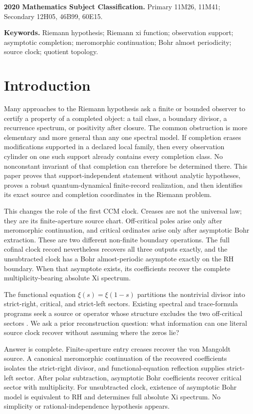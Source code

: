 \documentclass[11pt]{article}
\theoremstyle{definition}
\theoremstyle{remark}
\begin{document}
\medskip
\noindent\textbf{2020 Mathematics Subject Classification.}
Primary 11M26, 11M41; Secondary 12H05, 46B99, 60E15.

\noindent\textbf{Keywords.}
Riemann hypothesis; Riemann xi function; observation support; asymptotic completion;
meromorphic continuation; Bohr almost periodicity; source clock; quotient topology.

\section{Introduction}\label{sec:intro}

Many approaches to the Riemann hypothesis ask a finite or bounded observer to certify a property
of a completed object: a tail class, a boundary divisor, a recurrence spectrum, or positivity
after closure.  The common obstruction is more elementary and more general than any one spectral
model.  If completion erases modifications supported in a declared local family, then every
observation cylinder on one such support already contains every completion class.  No
nonconstant invariant of that completion can therefore be determined there.  This paper proves
that support-independent statement without analytic hypotheses, proves a robust
quantum-dynamical finite-record realization, and then identifies its exact source and completion
coordinates in the Riemann problem.

This changes the role of the first CCM clock.  Creases are not the universal law; they are its
finite-aperture source chart.  Off-critical poles arise
only after meromorphic continuation, and critical ordinates arise only after asymptotic Bohr
extraction.  These are two different non-finite boundary operations.  The full cofinal clock
record nevertheless recovers all three outputs exactly, and the unsubtracted clock has a Bohr
almost-periodic asymptote exactly on the RH boundary.  When that asymptote exists, its coefficients
recover the complete multiplicity-bearing absolute Xi spectrum.


The functional equation $\xi(s)=\xi(1-s)$ partitions the nontrivial divisor into strict-right,
critical, and strict-left sectors.  Existing spectral and trace-formula programs seek a source or
operator whose structure excludes the two off-critical sectors
\cite{Connes1999,Meyer2005,Hedenmalm2026,ConnesConsaniMoscovici2025}.  We ask a prior
reconstruction question: what information can one literal source clock recover without assuming
where the zeros lie?

Answer is complete.  Finite-aperture entry creases recover the von Mangoldt source.  A canonical
meromorphic continuation of the recovered coefficients isolates the strict-right divisor, and
functional-equation reflection supplies strict-left sector.  After polar subtraction, asymptotic
Bohr coefficients recover critical sector with multiplicity.  For unsubtracted clock, existence
of asymptotic Bohr model is equivalent to RH and determines full absolute Xi spectrum.  No
simplicity or rational-independence hypothesis appears.
\end{document}
